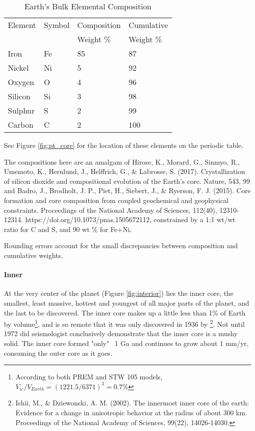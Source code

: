 \begin{table}
\centering
\begin{threeparttable}
\caption{Earth's Bulk Elemental Composition}
\label{tab:ebc2}
\begin{tabular}{@{}llll@{}} \toprule
Element	  &Symbol		&Composition\tnote{2}	&Cumulative\tnote{3}\\
      	  &	        &Weight \%		&Weight \% \\ \midrule
Iron		  &Fe				&85						&87\\
Nickel		&Ni			  &5		  			&92\\
Oxygen		&O		    &4		        &96\\
Silicon		&Si		    &3		        &98\\
Sulphur		&S		    &2	          &99\\
Carbon		&C		    &2	          &100\\ \bottomrule
\end{tabular}
\begin{tablenotes}
\item[1] See Figure \ref{fig:pt_core} for the location of these elements on the periodic table.
\item[2] The compositions here are an amalgam of Hirose, K., Morard, G., Sinmyo, R., Umemoto, K., Hernlund, J., Helffrich, G., \& Labrosse, S. (2017). Crystallization of silicon dioxide and compositional evolution of the Earth's core. Nature, 543, 99 and Badro, J., Brodholt, J. P., Piet, H., Siebert, J., \& Ryerson, F. J. (2015). Core formation and core composition from coupled geochemical and geophysical constraints. Proceedings of the National Academy of Sciences, 112(40), 12310-12314. https://doi.org/10.1073/pnas.1505672112, constrained by a 1:1 wt/wt ratio for C and S, and 90 wt \% for Fe+Ni. 
\item[3] Rounding errors account for the small discrepancies between composition and cumulative weights.
\end{tablenotes}
\end{threeparttable}
\end{table}

\paragraph{Inner}
At the very center of the planet (Figure \ref{fig:interior}) lies the inner core, the smallest, least massive, hottest and youngest of all major parts of the planet, and the last to be discovered. The inner core makes up a little less than 1\% of Earth by volume\footnote{According to both PREM and STW 105 models, $V_{ic}/V_{Earth}=(1221.5/6371)^3=0.7\%$}, and is so remote that it was only discovered in 1936 by \footnote{Ishii, M., \& Dziewonski, A. M. (2002). The innermost inner core of the earth: Evidence for a change in anisotropic behavior at the radius of about 300 km. Proceedings of the National Academy of Sciences, 99(22), 14026-14030.}. Not until 1972 did seismologist conclusively demonstrate that the inner core is a mushy solid. The inner core formed "only" ~1 Ga and continues to grow about 1 mm/yr, consuming the outer core as it goes.



